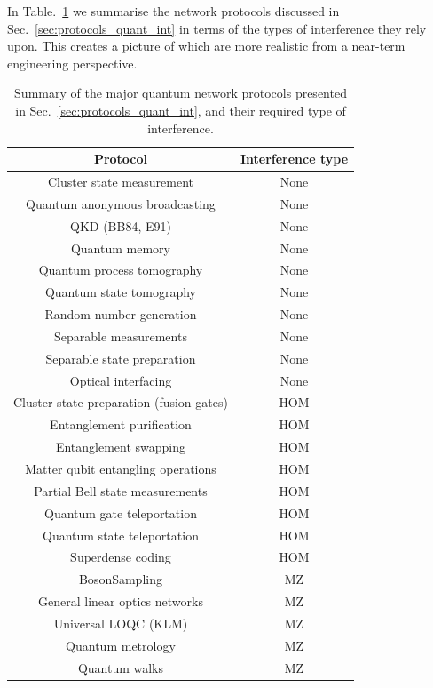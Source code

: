 \documentclass[aps, rmp, twocolumn, amsmath, amssymb, nofootinbib, superscriptaddress, longbibliography, floatfix, table-of-contents, eqsecnum]{revtex4-1}
\begin{document}
In Table.~\ref{table:summary_inter} we summarise the network protocols discussed in Sec.~\ref{sec:protocols_quant_int} in terms of the types of interference they rely upon. This creates a picture of which are more realistic from a near-term engineering perspective.

\begin{table}[!htb]
	\begin{tabular}{|c|c|}
		\hline
  		Protocol & Interference type \\
  		\hline
  		\hline
  		Cluster state measurement & None \\
   		Quantum anonymous broadcasting & None \\
  		QKD (BB84, E91) & None \\
  		Quantum memory & None \\
  		Quantum process tomography & None \\
  		Quantum state tomography & None \\
  		Random number generation & None \\
  		Separable measurements & None \\
  		Separable state preparation & None \\
  		Optical interfacing & None \\
  		\hline
  		Cluster state preparation (fusion gates) & HOM \\
  		Entanglement purification & HOM \\
  		Entanglement swapping & HOM \\ 
  		Matter qubit entangling operations & HOM \\
  		Partial Bell state measurements & HOM \\
   		Quantum gate teleportation & HOM \\
  		Quantum state teleportation & HOM \\
  		Superdense coding & HOM \\
  		\hline
  		{\sc BosonSampling} & MZ \\
  		General linear optics networks & MZ \\
  		Universal LOQC (KLM) & MZ \\
  		Quantum metrology & MZ \\
  		Quantum walks & MZ \\
    	\hline
	\end{tabular}
	\caption{Summary of the major quantum network protocols presented in Sec.~\ref{sec:protocols_quant_int}, and their required type of interference.}\label{table:summary_inter}
\end{table}
\end{document}
